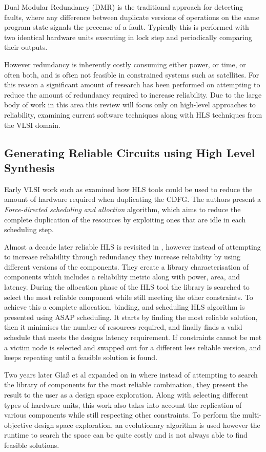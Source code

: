 
Dual Modular Redundancy (DMR) is the traditional approach for detecting faults,
where any difference between duplicate versions of operations on the same program state signals
the precense of a fault.
Typically this is performed with two identical hardware units executing in lock step and
periodically comparing their outputs.

However redundancy is inherently costly consuming either power, or time, or often both, and is
often not feasible in constrained systems such as satellites.
For this reason a significant amount of research has been performed on attempting to reduce the amount of
redundancy required to increase reliability.
Due to the large body of work in this area this review will focus only on high-level
approaches to reliability, examining current software techniques along with HLS techniques from the VLSI domain.

\subsection{Generating Reliable Circuits using High Level Synthesis}

Early VLSI work such as \cite{antola1998high} examined how HLS tools could be used to reduce the
amount of hardware required when duplicating the CDFG.
The authors present a \emph{Force-directed scheduling and alloction} algorithm, which aims to
reduce the complete duplication of the resources by exploiting ones that are idle in each
scheduling step.

Almost a decade later reliable HLS is revisited in \cite{tosun2005reliability}, however instead of
attempting to increase reliability through redundancy they increase reliability by using different versions
of the components.
They create a library characterisation of components which includes a reliability metric along with
power, area, and latency.
During the allocation phase of the HLS tool the library is searched to select the most reliable component
while still meeting the other constraints.
To achieve this a complete allocation, binding, and scheduling HLS algorithm is presented using ASAP scheduling.
It starts by finding the most reliable solution, then it minimises the number of resources required,
and finally finds a valid schedule that meets the designs latency requirement.
If constraints cannot be met a victim node is selected and swapped out for a different less reliable
version, and keeps repeating until a feasible solution is found.

Two years later Gla{\ss} et al expanded on \cite{tosun2005reliability} in \cite{glass2007interactive} where instead of
attempting to search the library of components for the most reliable combination, they present the result to the
user as a design space exploration.
Along with selecting different types of hardware units, this work also takes into account the replication of various
components while still respecting other constraints.
To perform the multi-objective design space exploration, an evolutionary algorithm is used however the runtime to
search the space can be quite costly and is not always able to find feasible solutions.

